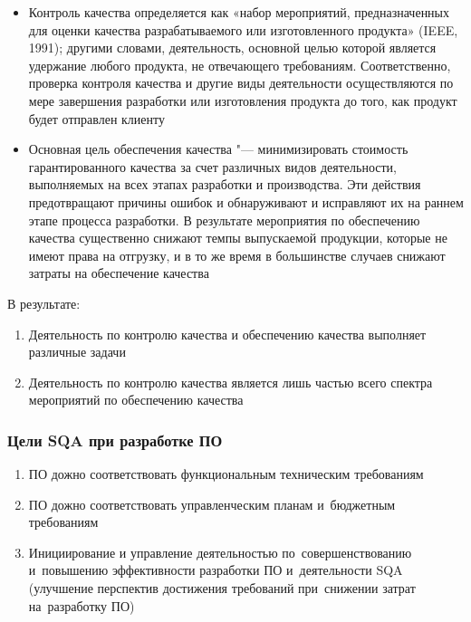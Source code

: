 \documentclass{../industrial-development}
\begin{document}
\begin{itemize}
\item Контроль качества определяется как «набор мероприятий, предназначенных для оценки качества разрабатываемого или изготовленного продукта» (IEEE, 1991); другими словами, деятельность, основной целью которой является удержание любого продукта, не отвечающего требованиям. Соответственно, проверка контроля качества и другие виды деятельности осуществляются по мере завершения разработки или изготовления продукта до того, как продукт будет отправлен клиенту
\item Основная цель обеспечения качества "--- минимизировать стоимость гарантированного качества за счет различных видов деятельности, выполняемых на всех этапах разработки и производства. Эти действия предотвращают причины ошибок и обнаруживают и исправляют их на раннем этапе процесса разработки. В результате мероприятия по обеспечению качества существенно снижают темпы выпускаемой продукции, которые не имеют права на отгрузку, и в то же время в большинстве случаев снижают затраты на обеспечение качества
  	\end{itemize}
В результате:
 	\begin{enumerate}
\item Деятельность по контролю качества и обеспечению качества выполняет различные задачи
\item Деятельность по контролю качества является лишь частью всего спектра мероприятий по обеспечению качества
  	\end{enumerate}



\begin{frame} \frametitle{Цели SQA при разработке ПО}
 	 \begin{enumerate}
\item ПО дожно соответствовать функциональным техническим требованиям
\item ПО дожно соответствовать управленческим планам и~бюджетным требованиям
\item Инициирование и управление деятельностью по~совершенствованию и~повышению эффективности разработки ПО и~деятельности SQA (улучшение перспектив достижения требований при~снижении затрат на~разработку ПО)
  	\end{enumerate}
\end{frame}

\lecturenotes
\end{document}
